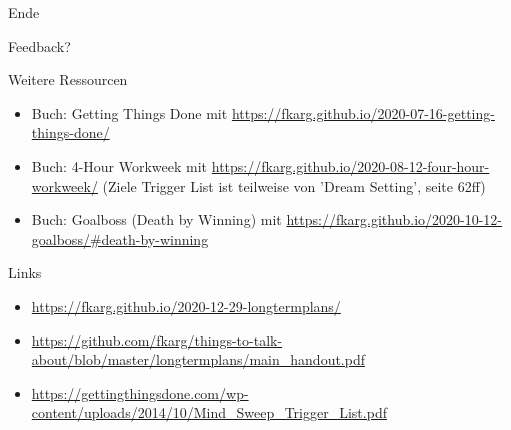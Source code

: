 
\begin{frame}[standout]
    \Huge
    Ende
\end{frame}


\begin{frame}[standout]
    \Huge
    Feedback?
\end{frame}


\appendix
\backupbegin


\begin{frame}[c]{Weitere Ressourcen}
    \begin{itemize}
        \item Buch: Getting Things Done \cite{gtd-book} mit \url{https://fkarg.github.io/2020-07-16-getting-things-done/}
        \item Buch: 4-Hour Workweek \cite{4h-workweek} mit \url{https://fkarg.github.io/2020-08-12-four-hour-workweek/} (Ziele Trigger List ist teilweise von 'Dream Setting', seite 62ff)
        \item Buch: Goalboss \cite{goalboss} (Death by Winning) mit \url{https://fkarg.github.io/2020-10-12-goalboss/\#death-by-winning}
    \end{itemize}
\end{frame}


\begin{frame}[c]{Links}
    \begin{itemize}
        \item \url{https://fkarg.github.io/2020-12-29-longtermplans/}
        \item \url{https://github.com/fkarg/things-to-talk-about/blob/master/longtermplans/main_handout.pdf}
        \item \url{https://gettingthingsdone.com/wp-content/uploads/2014/10/Mind_Sweep_Trigger_List.pdf}
    \end{itemize}
\end{frame}


